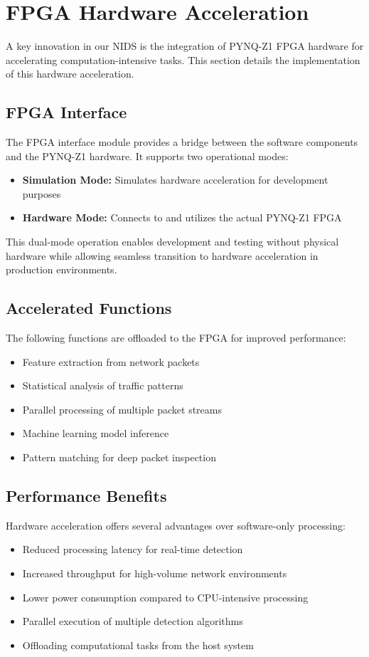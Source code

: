 \documentclass[12pt]{article}
\begin{document}
\section{FPGA Hardware Acceleration}
A key innovation in our NIDS is the integration of PYNQ-Z1 FPGA hardware for accelerating computation-intensive tasks. This section details the implementation of this hardware acceleration.

\subsection{FPGA Interface}
The FPGA interface module provides a bridge between the software components and the PYNQ-Z1 hardware. It supports two operational modes:
\begin{itemize}
  \item \textbf{Simulation Mode:} Simulates hardware acceleration for development purposes
  \item \textbf{Hardware Mode:} Connects to and utilizes the actual PYNQ-Z1 FPGA
\end{itemize}

This dual-mode operation enables development and testing without physical hardware while allowing seamless transition to hardware acceleration in production environments.

\subsection{Accelerated Functions}
The following functions are offloaded to the FPGA for improved performance:
\begin{itemize}
  \item Feature extraction from network packets
  \item Statistical analysis of traffic patterns
  \item Parallel processing of multiple packet streams
  \item Machine learning model inference
  \item Pattern matching for deep packet inspection
\end{itemize}

\subsection{Performance Benefits}
Hardware acceleration offers several advantages over software-only processing:
\begin{itemize}
  \item Reduced processing latency for real-time detection
  \item Increased throughput for high-volume network environments
  \item Lower power consumption compared to CPU-intensive processing
  \item Parallel execution of multiple detection algorithms
  \item Offloading computational tasks from the host system
\end{itemize}
\end{document}
